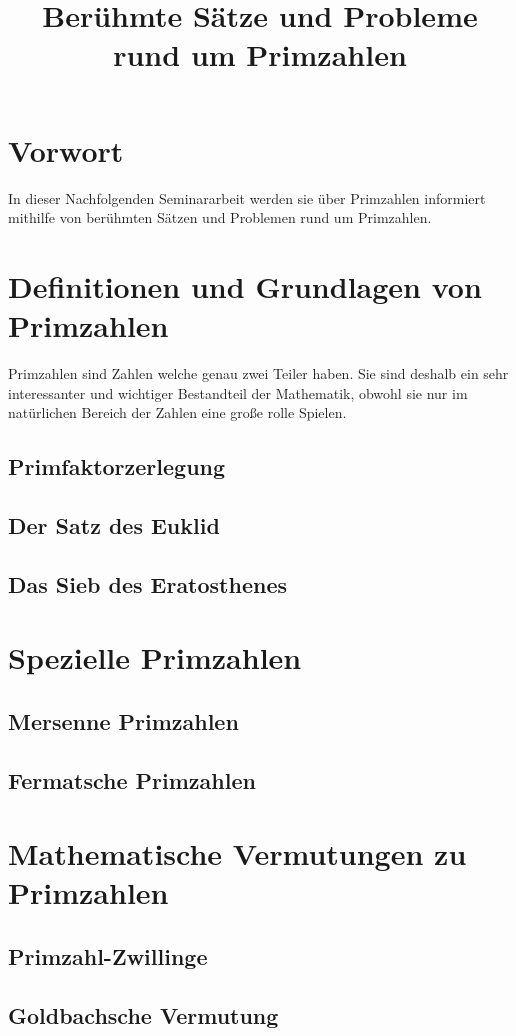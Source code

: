 \documentclass[11pt]{article}
\begin{document}
\title{Berühmte Sätze und Probleme rund um Primzahlen}
\tableofcontents
\newpage
\section*{Vorwort}
In dieser Nachfolgenden Seminararbeit werden sie über Primzahlen informiert mithilfe von
berühmten Sätzen und Problemen rund um Primzahlen.
\newpage
\section{Definitionen und Grundlagen von Primzahlen}
Primzahlen sind Zahlen welche genau zwei Teiler haben. Sie sind deshalb ein sehr interessanter und wichtiger Bestandteil der Mathematik, obwohl sie nur im natürlichen Bereich der Zahlen eine große rolle Spielen.
\subsection{Primfaktorzerlegung}

\subsection{Der Satz des Euklid}
\subsection{Das Sieb des Eratosthenes}
\section{Spezielle Primzahlen}
\subsection{Mersenne Primzahlen}
\subsection{Fermatsche Primzahlen}
\section{Mathematische Vermutungen zu Primzahlen}
\subsection{Primzahl-Zwillinge}
\subsection{Goldbachsche Vermutung}
\end{document}
